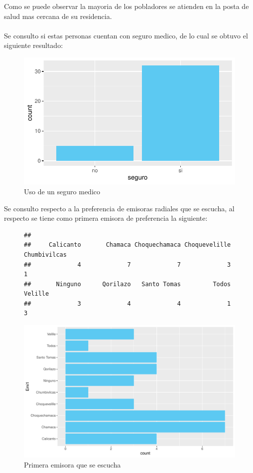 \documentclass[12pt]{article}\usepackage[]{graphicx}\usepackage[]{xcolor}
\makeatletter
\def\maxwidth{ %
  \ifdim\Gin@nat@width>\linewidth
    \linewidth
  \else
    \Gin@nat@width
  \fi
}
\newenvironment{kframe}{%
 \def\at@end@of@kframe{}%
 \ifinner\ifhmode%
  \def\at@end@of@kframe{\end{minipage}}%
  \begin{minipage}{\columnwidth}%
 \fi\fi%
 \def\FrameCommand##1{\hskip\@totalleftmargin \hskip-\fboxsep
 \colorbox{shadecolor}{##1}\hskip-\fboxsep
     \hskip-\linewidth \hskip-\@totalleftmargin \hskip\columnwidth}%
 \MakeFramed {\advance\hsize-\width
   \@totalleftmargin\z@ \linewidth\hsize
   \@setminipage}}%
 {\par\unskip\endMakeFramed%
 \at@end@of@kframe}
\newenvironment{knitrout}{}{} %
\makeatother
\begin{document}
  Como se puede observar la mayoria de los pobladores se atienden en la posta de salud mas cercana de su residencia.\\
  \\
	Se consulto si estas personas cuentan con seguro medico, de lo cual se obtuvo el siguiente resultado:
	\begin{figure}[H]
	\centering
\begin{knitrout}
\color{fgcolor}
\includegraphics[width=\maxwidth]{figure/doce-1} 
\end{knitrout}
	\caption{Uso de un seguro medico}
	\end{figure}
	Se consulto respecto a la preferencia de emisoras radiales que se escucha, al respecto se tiene como primera emisora de preferencia la siguiente:
	\begin{figure}[H]
	\centering
\begin{knitrout}
\color{fgcolor}\begin{kframe}
\begin{verbatim}
## 
##     Calicanto       Chamaca Choquechamaca Choquevelille  Chumbivilcas 
##             4             7             7             3             1 
##       Ninguno      Qorilazo   Santo Tomas         Todos       Velille 
##             3             4             4             1             3
\end{verbatim}
\end{kframe}
\includegraphics[width=\maxwidth]{figure/one-1} 
\end{knitrout}
	\caption{Primera emisora que se escucha}
	\end{figure}
\end{document}
